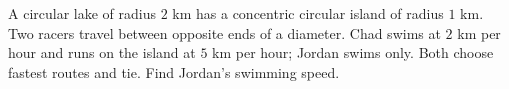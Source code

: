 A circular lake of radius $2$ km has a concentric circular island of radius $1$ km. Two racers travel between opposite ends of a diameter. Chad swims at $2$ km per hour and runs on the island at $5$ km per hour; Jordan swims only. Both choose fastest routes and tie. Find Jordan's swimming speed.
